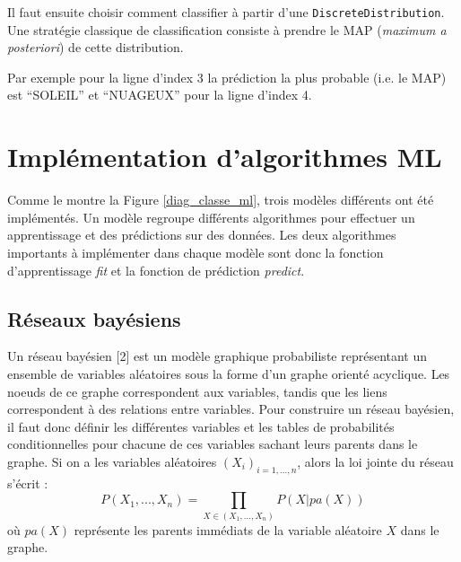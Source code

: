 Il faut ensuite choisir comment classifier à partir d’une \texttt{DiscreteDistribution}. Une stratégie classique de classification consiste à prendre le MAP (\textit{maximum a posteriori}) de cette distribution.

Par exemple pour la ligne d'index 3 la prédiction la plus probable (i.e. le MAP) est “SOLEIL” et “NUAGEUX” pour la ligne d'index 4.

\chapter{Implémentation d'algorithmes ML}

Comme le montre la Figure \ref{diag_classe_ml}, trois modèles différents ont été implémentés. Un modèle regroupe différents algorithmes pour effectuer un apprentissage et des prédictions sur des données. Les deux algorithmes importants à implémenter dans chaque modèle sont donc la fonction d’apprentissage \textit{fit}  et la fonction de prédiction \textit{predict}.

\clearpage
\section{Réseaux bayésiens}

Un réseau bayésien [2] est un modèle graphique probabiliste représentant un ensemble de variables
aléatoires sous la forme d'un graphe orienté acyclique. Les noeuds de ce graphe correspondent aux
variables, tandis que les liens correspondent à des relations entre variables. Pour construire un
réseau bayésien, il faut donc définir les différentes variables et les tables de probabilités
conditionnelles pour chacune de ces variables sachant leurs parents dans le graphe. Si on a les variables aléatoires $(X_{i})_{i=1,...,n}$, alors la loi jointe du réseau s’écrit :
$$P(X_{1}, ...,X_{n})= \prod_{X \in (X_{1}, ...,X_{n})} P(X|pa(X))$$
où $pa(X)$ représente les parents immédiats de la variable aléatoire $X$ dans le graphe.


